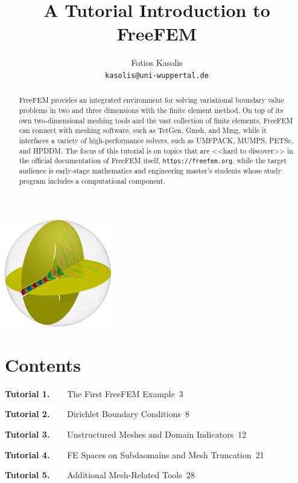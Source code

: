 \documentclass[9pt]{amsart}
\author{Fotios Kasolis\\
\MakeLowercase{\texttt{kasolis@uni-wuppertal.de}}}
\title{A Tutorial Introduction to FreeFEM}
\theoremstyle{remark}
\theoremstyle{definition}
\begin{document}
\begin{abstract}
FreeFEM provides an integrated environment for solving variational boundary value problems in two and three dimensions with the finite element method. On top of its own two-dimensional meshing tools and the vast collection of finite elements, FreeFEM can connect with meshing software, such as TetGen, Gmsh, and Mmg, while it interfaces a variety of high-performance solvers, such as UMFPACK, MUMPS, PETSc, and HPDDM. The focus of this tutorial is on topics that are <<hard to discover>> in the official documentation of FreeFEM itself, \verb!https://freefem.org!, while the target audience is early-stage mathematics and engineering master's students whose study program includes a computational component.
\end{abstract}

\maketitle
\thispagestyle{empty}

\begin{center}
\includegraphics[width=0.35\textwidth]{figs/cover}
\end{center}

\vfill

\section*{Contents}
%
%
\textbf{Tutorial 1.~~~}
The First FreeFEM Example\dotfill~3

\textbf{Tutorial 2.~~~}
Dirichlet Boundary Conditions\dotfill~8

\textbf{Tutorial 3.~~~}
Unstructured Meshes and Domain Indicators\dotfill~12

\textbf{Tutorial 4.~~~}
FE Spaces on Subdaomains and Mesh Truncation\dotfill~21

\textbf{Tutorial 5.~~~}
Additional Mesh-Related Tools\dotfill~28
\end{document}
